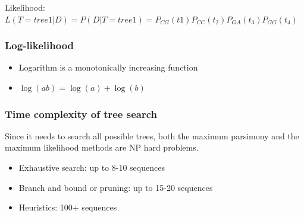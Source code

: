 Likelihood: $L(T=tree1|D ) = P(D|T=tree1 )=P_{CG}(t{1})P_{CC}(t_{2})P_{GA}(t_{3})P_{GG}(t_{4})$

%
%
\subsubsection*{Log-likelihood}
\begin{itemize}
\item Logarithm is a monotonically increasing function 
\item $\log⁡(ab)=\log⁡(a)+\log⁡(b)$
\end{itemize}

%
%
\subsubsection*{Time complexity of tree search}
Since it needs to search all possible trees, both the maximum parsimony and the maximum likelihood methods are NP hard problems. 
\begin{itemize}
\item Exhaustive search: up to 8-10 sequences
\item Branch and bound or pruning: up to 15-20 sequences
\item Heuristics: 100+ sequences
\end{itemize}

\bigskip 

%
